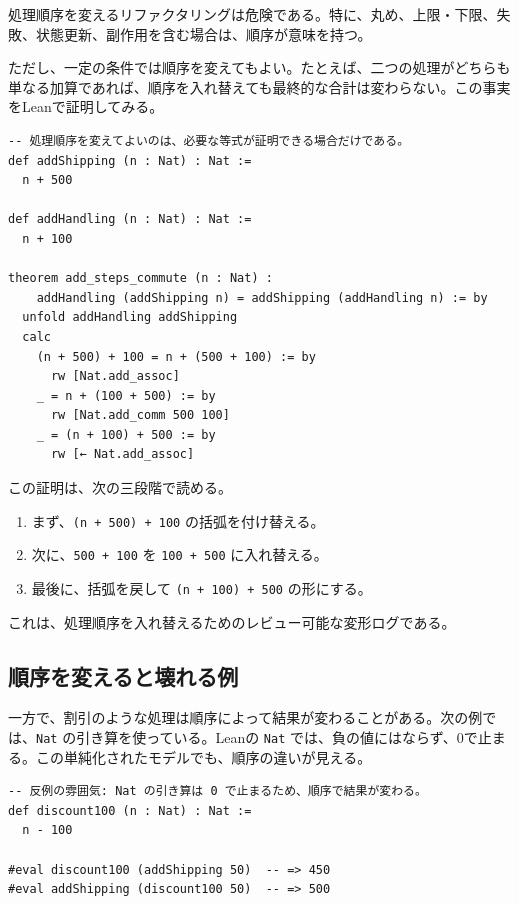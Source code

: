 処理順序を変えるリファクタリングは危険である。特に、丸め、上限・下限、失敗、状態更新、副作用を含む場合は、順序が意味を持つ。

ただし、一定の条件では順序を変えてもよい。たとえば、二つの処理がどちらも単なる加算であれば、順序を入れ替えても最終的な合計は変わらない。この事実をLeanで証明してみる。

\begin{listing}[htbp]
\begin{verbatim}
-- 処理順序を変えてよいのは、必要な等式が証明できる場合だけである。
def addShipping (n : Nat) : Nat :=
  n + 500

def addHandling (n : Nat) : Nat :=
  n + 100

theorem add_steps_commute (n : Nat) :
    addHandling (addShipping n) = addShipping (addHandling n) := by
  unfold addHandling addShipping
  calc
    (n + 500) + 100 = n + (500 + 100) := by
      rw [Nat.add_assoc]
    _ = n + (100 + 500) := by
      rw [Nat.add_comm 500 100]
    _ = (n + 100) + 500 := by
      rw [← Nat.add_assoc]
\end{verbatim}
\caption{二つの加算処理の順序を入れ替える}
\label{lst:ch03_order_commutes}
\end{listing}

この証明は、次の三段階で読める。

\begin{enumerate}
\item まず、\texttt{(n + 500) + 100} の括弧を付け替える。
\item 次に、\texttt{500 + 100} を \texttt{100 + 500} に入れ替える。
\item 最後に、括弧を戻して \texttt{(n + 100) + 500} の形にする。
\end{enumerate}

これは、処理順序を入れ替えるためのレビュー可能な変形ログである。

\subsection{順序を変えると壊れる例}

一方で、割引のような処理は順序によって結果が変わることがある。次の例では、\texttt{Nat} の引き算を使っている。Leanの \texttt{Nat} では、負の値にはならず、0で止まる。この単純化されたモデルでも、順序の違いが見える。

\begin{listing}[htbp]
\begin{verbatim}
-- 反例の雰囲気: Nat の引き算は 0 で止まるため、順序で結果が変わる。
def discount100 (n : Nat) : Nat :=
  n - 100

#eval discount100 (addShipping 50)  -- => 450
#eval addShipping (discount100 50)  -- => 500
\end{verbatim}
\caption{順序を変えると結果が変わる例}
\label{lst:ch03_order_not_safe}
\end{listing}

